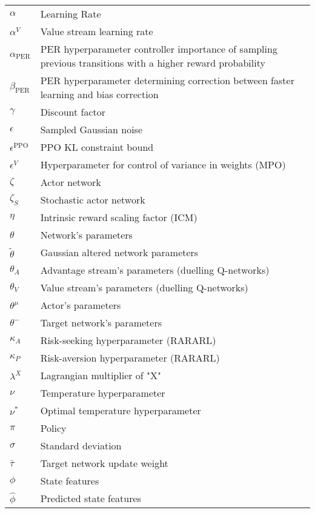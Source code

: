 \begin{longtable}{p{2.5cm}p{12cm}}
    \midrule
    $\alpha$ & Learning Rate \\
    $\alpha^V$ & Value stream learning rate \\
    $\alpha_{\text{PER}}$ & PER hyperparameter controller importance of sampling previous transitions with a higher reward probability\\
    $\beta_{\text{PER}}$ & PER hyperparameter determining correction between faster learning and bias correction\\
    $\gamma$ & Discount factor \\
    $\epsilon$ & Sampled Gaussian noise \\
    $\epsilon^{\text{PPO}}$ & PPO KL constraint bound \\
    $\epsilon^V$ & Hyperparameter for control of variance in weights (MPO) \\
    $\zeta$ & Actor network \\
    $\zeta_S$ & Stochastic actor network \\
    $\eta$ & Intrinsic reward scaling factor (ICM) \\
    $\theta$ & Network's parameters \\
    $\tilde{\theta}$ & Gaussian altered network parameters \\
    $\theta_{A}$ & Advantage stream's parameters (duelling Q-networks) \\
    $\theta_{V}$ & Value stream's parameters (duelling Q-networks) \\
    $\theta^{\mu}$ & Actor's parameters \\
    $\theta^{-}$ & Target network's parameters \\
    $\kappa_A$ & Risk-seeking hyperparameter (RARARL) \\
    $\kappa_P$ & Risk-aversion hyperparameter (RARARL) \\
    $\lambda^X$ & Lagrangian multiplier of "X" \\
    $\nu$ & Temperature hyperparameter \\
    $\nu^*$ & Optimal temperature hyperparameter \\
    $\pi$ & Policy \\
    $\sigma$ & Standard deviation \\
    $\bar{\tau}$ & Target network update weight \\
    $\phi$ & State features \\
    $\hat{\phi}$ & Predicted state features \\
    \bottomrule
\end{longtable}


